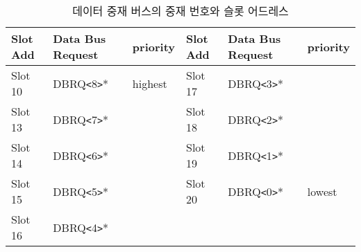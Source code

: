 %
%
\begin{table}[htbp]
\caption{데이터 중재 버스의 중재 번호와 슬롯 어드레스}\label{table:dbrq-signal}
   \begin{center}
   \begin{tabular}{|l|l|l||l|l|l|} \hline
      Slot Add & Data Bus Request & priority &
        Slot Add & Data Bus Request & priority \\ \hline \hline
      Slot 10 & DBRQ{\tt <}8{\tt >}* & highest &
        Slot 17 & DBRQ{\tt <}3{\tt >}* & \\ \hline
      Slot 13 & DBRQ{\tt <}7{\tt >}* & &
        Slot 18 & DBRQ{\tt <}2{\tt >}* & \\ \hline
      Slot 14 & DBRQ{\tt <}6{\tt >}* & &
        Slot 19 & DBRQ{\tt <}1{\tt >}* & \\ \hline
      Slot 15 & DBRQ{\tt <}5{\tt >}* & &
        Slot 20 & DBRQ{\tt <}0{\tt >}* & lowest \\ \hline
      Slot 16 & DBRQ{\tt <}4{\tt >}* & & & & \\ \hline
   \end{tabular}
   \end{center}
\end{table}
%
%
